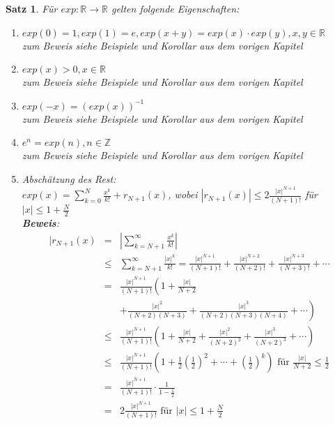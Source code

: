 \documentclass[ngerman,titlepage,twoside, parskip=half*]{scrreprt}
\newcommand*{\Z}{\mathbb{Z}}
\newcommand*{\R}{\mathbb{R}}
\theoremstyle{plain}
\newtheorem{theorem}{Satz}[section]
\theoremstyle{definition}
\theoremstyle{remark}
\begin{document}
\begin{theorem}
  \label{satz:expEigenschaft}
Für $exp\colon\R\rightarrow\R$ gelten folgende Eigenschaften:
\begin{enumerate}[i]
  \item $exp(0)=1, exp(1)=e, exp(x+y)=exp(x)\cdot exp(y), x,y \in \R$\\
    zum Beweis siehe Beispiele und Korollar aus dem vorigen Kapitel
  \item $exp(x)>0, x\in \R$\\
    zum Beweis siehe Beispiele und Korollar aus dem vorigen Kapitel
  \item $exp(-x)=(exp(x))^{-1}$\\
    zum Beweis siehe Beispiele und Korollar aus dem vorigen Kapitel
  \item $e^n=exp(n), n\in \Z$\\
    zum Beweis siehe Beispiele und Korollar aus dem vorigen Kapitel
  \item Abschätzung des Rest:\\
    $exp(x)=\sum_{k=0}^N \frac{x^k}{k!}+r_{N+1}(x)$, wobei $|r_{N+1}(x)|\leq 2\frac{|x|^{N+1}}{(N+1)!}$ für $|x|\leq 1+\frac{N}{2}$\\
    \textbf{Beweis}:
    \begin{align*}
      |r_{N+1}(x) & = & \left| \sum_{k=N+1}^\infty \frac{x^k}{k!}\right|\\
      & \leq & \sum_{k=N+1}^\infty \frac{|x|^k}{k!}=\frac{|x|^{N+1}}{(N+1)!}+\frac{|x|^{N+2}}{(N+2)!}+\frac{|x|^{N+3}}{(N+3)!}+\cdots\\
      & = & \frac{|x|^{N+1}}{(N+1)!}\left( 1+\frac{|x|}{N+2}\right.\\
      & & \left. +\frac{|x|^2}{(N+2)(N+3)}+\frac{|x|^3}{(N+2)(N+3)(N+4)}+\cdots\right)\\
      & \leq & \frac{|x|^{N+1}}{(N+1)!}\left( 1+\frac{|x|}{N+2}+\frac{|x|^2}{(N+2)^2}+\frac{|x|^3}{(N+2)^3}+\cdots \right)\\
      & \leq & \frac{|x|^{N+1}}{(N+1)!}\left( 1+\frac{1}{2}\left(\frac{1}{2}\right)^2+\cdots + \left(\frac{1}{2}\right)^k\right)
        \text{ für } \frac{|x|}{N+2}\leq \frac{1}{2}\\
      & = & \frac{|x|^{N+1}}{(N+1)!}\cdot \frac{1}{1-\frac{1}{2}}\\
      & = & 2\frac{|x|^{N+1}}{(N+1)!} \text{ für } |x|\leq 1+\frac{N}{2}
    \end{align*}
\end{enumerate}
\end{theorem}
\end{document}
